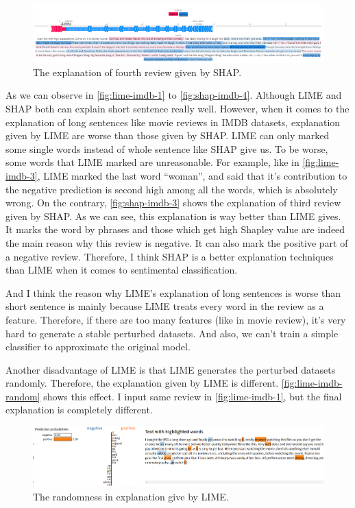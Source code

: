 \documentclass{article}[12pt]
\begin{document}
\begin{figure}[htbp]
	\centering
	\includegraphics[width=\linewidth]{figure/shap-imdb-4}
	\caption{The explanation of fourth review given by SHAP.}
	\label{fig:shap-imdb-4}
\end{figure}

As we can observe in \autoref{fig:lime-imdb-1} to \autoref{fig:shap-imdb-4}. Although LIME and SHAP both can explain short sentence really well. However, when it comes to the explanation of long sentences like movie reviews in IMDB datasets, explanation given by LIME are worse than those given by SHAP. LIME can only marked some single words instead of whole sentence like SHAP give us. To be worse, some words that LIME marked are unreasonable. For example, like in \autoref{fig:lime-imdb-3}, LIME marked the last word ``woman'', and said that it's contribution to the negative prediction is second high among all the words, which is absolutely wrong. On the contrary, \autoref{fig:shap-imdb-3} shows the explanation of third review given by SHAP. As we can see, this explanation is way better than LIME gives. It marks the word by phrases and those which get high Shapley value are indeed the main reason why this review is negative. It can also mark the positive part of a negative review. Therefore, I think SHAP is a better explanation techniques than LIME when it comes to sentimental classification.

And I think the reason why LIME's explanation of long sentences is worse than short sentence is mainly because LIME treats every word in the review as a feature. Therefore, if there are too many features (like in movie review), it's very hard to generate a stable perturbed datasets. And also, we can't train a simple classifier to approximate the original model.

Another disadvantage of LIME is that LIME generates the perturbed datasets randomly. Therefore, the explanation given by LIME is different. \autoref{fig:lime-imdb-random} shows this effect. I input same review in \autoref{fig:lime-imdb-1}, but the final explanation is completely different.

\begin{figure}[htbp]
	\centering
	\includegraphics[width=\linewidth]{figure/lime-imdb-random}
	\caption{The randomness in explanation give by LIME.}
	\label{fig:lime-imdb-random}
\end{figure}
\end{document}
